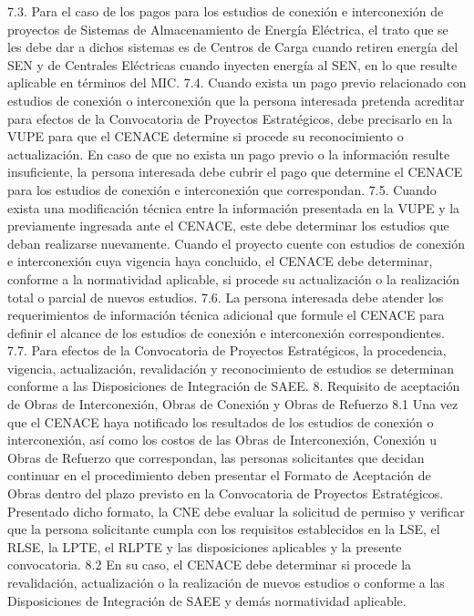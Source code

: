 7.3. Para el caso de los pagos para los estudios de conexión e interconexión de proyectos de Sistemas de Almacenamiento de Energía Eléctrica, el trato que se les debe dar a dichos sistemas es de Centros de Carga cuando retiren energía del SEN y de Centrales Eléctricas cuando inyecten energía al SEN, en lo que resulte aplicable en términos del MIC.
7.4. Cuando exista un pago previo relacionado con estudios de conexión o interconexión que la persona interesada pretenda acreditar para efectos de la Convocatoria de Proyectos Estratégicos, debe precisarlo en la VUPE para que el CENACE determine si procede su reconocimiento o actualización.
En caso de que no exista un pago previo o la información resulte insuficiente, la persona interesada debe cubrir el pago que determine el CENACE para los estudios de conexión e interconexión que correspondan.
7.5. Cuando exista una modificación técnica entre la información presentada en la VUPE y la previamente ingresada ante el CENACE, este debe determinar los estudios que deban realizarse nuevamente.
Cuando el proyecto cuente con estudios de conexión e interconexión cuya vigencia haya concluido, el CENACE debe determinar, conforme a la normatividad aplicable, si procede su actualización o la realización total o parcial de nuevos estudios.
7.6. La persona interesada debe atender los requerimientos de información técnica adicional que formule el CENACE para definir el alcance de los estudios de conexión e interconexión correspondientes.
7.7. Para efectos de la Convocatoria de Proyectos Estratégicos, la procedencia, vigencia, actualización, revalidación y reconocimiento de estudios se determinan conforme a las Disposiciones de Integración de SAEE.
8. Requisito de aceptación de Obras de Interconexión, Obras de Conexión y Obras de Refuerzo
8.1 Una vez que el CENACE haya notificado los resultados de los estudios de conexión o interconexión, así como los costos de las Obras de Interconexión, Conexión u Obras de Refuerzo que correspondan, las personas solicitantes que decidan continuar en el procedimiento deben presentar el Formato de Aceptación de Obras dentro del plazo previsto en la Convocatoria de Proyectos Estratégicos.
Presentado dicho formato, la CNE debe evaluar la solicitud de permiso y verificar que la persona solicitante cumpla con los requisitos establecidos en la LSE, el RLSE, la LPTE, el RLPTE y las disposiciones aplicables y la presente convocatoria.
8.2 En su caso, el CENACE debe determinar si procede la revalidación, actualización o la realización de nuevos estudios o conforme a las Disposiciones de Integración de SAEE y demás normatividad aplicable.
